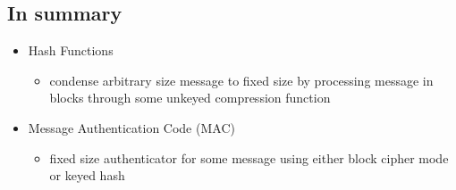 \documentclass{article}
\begin{document}
\subsection{In summary}
\begin{itemize}
    \item Hash Functions
    \begin{itemize}
        \item condense arbitrary size message to fixed size by processing message in blocks through some unkeyed compression function
    \end{itemize}
    \item Message Authentication Code (MAC)
    \begin{itemize}
        \item fixed size authenticator for some message using either block cipher mode or keyed hash
    \end{itemize}
\end{itemize}
\end{document}
